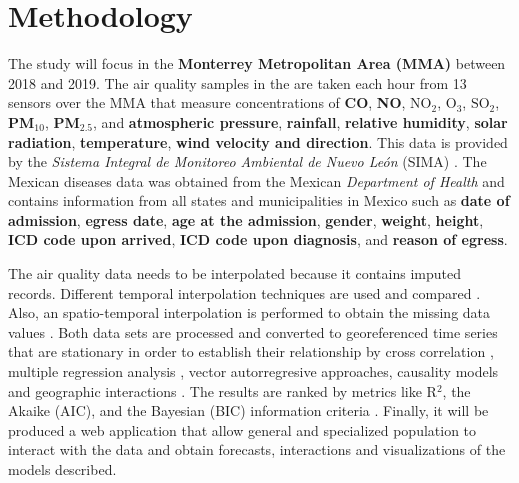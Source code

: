 \documentclass[
  11pt,
  a4paper,
  oneside
]{article}
\begin{document}
\section{Methodology}
The study will focus in the \textbf{Monterrey Metropolitan Area (MMA)} between 2018 and 2019. The air quality samples in the are taken each hour from 13 sensors over the MMA that measure concentrations of \textbf{CO}, \textbf{NO}, \textbf{$\text{NO}_2$}, \textbf{$\text{O}_3$}, \textbf{$\text{SO}_2$}, \textbf{PM$_{10}$}, \textbf{PM$_{2.5}$}, and \textbf{atmospheric pressure}, \textbf{rainfall}, \textbf{relative humidity}, \textbf{solar radiation}, \textbf{temperature}, \textbf{wind velocity and direction}. This data is provided by the \textit{Sistema Integral de Monitoreo Ambiental de Nuevo León} (SIMA) \citep{aireNL}. The Mexican diseases data was obtained from the Mexican \textit{Department of Health} \citep{egresos} and contains information from all states and municipalities in Mexico such as \textbf{date of admission}, \textbf{egress date}, \textbf{age at the admission}, \textbf{gender}, \textbf{weight}, \textbf{height}, \textbf{ICD code upon arrived}, \textbf{ICD code upon diagnosis}, and \textbf{reason of egress}.

The air quality data needs to be interpolated because it contains imputed records. Different temporal interpolation techniques are used and compared \citep{Friedman1962}. Also, an spatio-temporal interpolation is performed to obtain the missing data values \citep{LiEA2002}. Both data sets are processed and converted to georeferenced time series \citep{Wei2019} that are stationary \citep{Hyndman2018} in order to establish their relationship by cross correlation \citep{derrickEA2004}, multiple regression analysis \citep{Brockwell2002}, vector autorregresive approaches, causality models \citep{popescuEA2013} and geographic interactions \citep{ComberEA2019}. The results are ranked by metrics like R$^2$, the Akaike (AIC), and the Bayesian (BIC) information criteria \citep{Albert2007}. Finally, it will be produced a web application that allow general and specialized population to interact with the data and obtain forecasts, interactions and visualizations of the models described.
\end{document}
